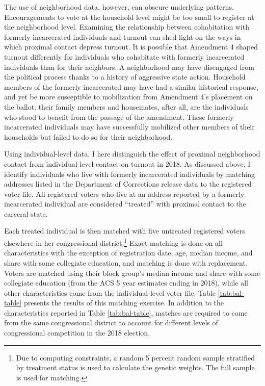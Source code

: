 \documentclass[
  12pt,
]{article}
\begin{document}
The use of neighborhood data, however, can obscure underlying patterns. Encouragements to vote at the household level might be too small to register at the neighborhood level. Examining the relationship between cohabitation with formerly incarcerated individuals and turnout can shed light on the ways in which proximal contact depress turnout. It is possible that Amendment 4 shaped turnout differently for individuals who cohabitate with formerly incarcerated individuals than for their neighbors. A neighborhood may have disengaged from the political process thanks to a history of aggressive state action. Household members of the formerly incarcerated may have had a similar historical response, and yet be more susceptible to mobilization from Amendment 4's placement on the ballot; their family members and housemates, after all, are the individuals who stood to benefit from the passage of the amendment. These formerly incarcerated individuals may have successfully mobilized other members of their households but failed to do so for their neighborhood.

Using individual-level data, I here distinguish the effect of proximal neighborhood contact from individual-level contact on turnout in 2018. As discussed above, I identify individuals who live with formerly incarcerated individuals by matching addresses listed in the Department of Corrections release data to the registered voter file. All registered voters who live at an address reported by a formerly incarcerated individual are considered ``treated'' with proximal contact to the carceral state.

Each treated individual is then matched with five untreated registered voters elsewhere in her congressional district.\footnote{Due to computing constraints, a random 5 percent random sample stratified by treatment status is used to calculate the genetic weights. The full sample is used for matching.} Exact matching is done on all characteristics with the exception of registration date, age, median income, and share with some collegiate education, and matching is done with replacement. Voters are matched using their block group's median income and share with some collegiate education (from the ACS 5 year estimates ending in 2018), while all other characteristics come from the individual-level voter file. Table \ref{tab:bal-table} presents the results of this matching exercise. In addition to the characteristics reported in Table \ref{tab:bal-table}, matches are required to come from the same congressional district to account for different levels of congressional competition in the 2018 election.
\end{document}
